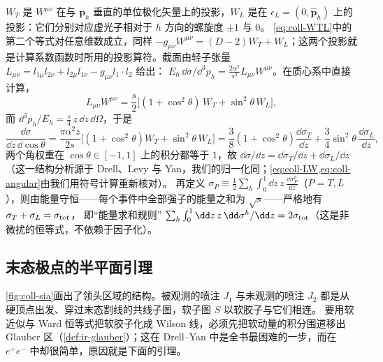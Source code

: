 $W_T$ 是 $W^{\mu\nu}$ 在与 $\bm p_h$ 垂直的单位极化矢量上的投影，$W_L$ 是在 $\epsilon_L=(0,\hat{\bm p}_h)$ 上的投影：它们分别对应虚光子相对于 $h$ 方向的螺旋度 $\pm1$ 与 $0$。
\cref{eq:coll-WTL}中的第二个等式对任意维数成立，同样 $-g_{\mu\nu}W^{\mu\nu}=(D-2)W_T+W_L$；这两个投影就是计算系数函数时所用的投影算符。截面由轻子张量 $L_{\mu\nu}=l_{1\mu}l_{2\nu}+l_{2\mu}l_{1\nu}-g_{\mu\nu}l_1\cdot l_2$ 给出：
$E_h\,\dd\sigma/\dd^3p_h=\frac{2\alpha^2}{s^3}L_{\mu\nu}W^{\mu\nu}$\cite[式~(12.6)]{Collins2011}。在质心系中直接计算，
\begin{equation}\label{eq:coll-LW}
L_{\mu\nu}W^{\mu\nu}=\frac s2\Big[(1+\cos^2\theta)\,W_T+\sin^2\theta\,W_L\Big],
\end{equation}
而 $\dd^3p_h/E_h=\frac s4\,z\,\dd z\,\dd\Omega$，于是
\begin{equation}\label{eq:coll-angular}
\frac{\dd\sigma}{\dd z\,\dd\cos\theta}=\frac{\pi\alpha^2z}{2s}\Big[(1+\cos^2\theta)W_T+\sin^2\theta\,W_L\Big]
=\frac38(1+\cos^2\theta)\frac{\dd\sigma_T}{\dd z}+\frac34\sin^2\theta\,\frac{\dd\sigma_L}{\dd z},
\end{equation}
两个角权重在 $\cos\theta\in[-1,1]$ 上的积分都等于 $1$，故 $\dd\sigma/\dd z=\dd\sigma_T/\dd z+\dd\sigma_L/\dd z$（这一结构分析源于 Drell、Levy 与 Yan，我们的归一化同\cite[第~12.1~节]{Collins2011}；\cref{eq:coll-LW,eq:coll-angular}由我们用符号计算重新核对）。%
再定义 $\sigma_P\equiv\frac12\sum_h\int_0^1\dd z\,z\,\frac{\dd\sigma^h_P}{\dd z}$（$P=T,L$），则由能量守恒——每个事件中全部强子的能量之和为 $\sqrt s$——严格地有 $\sigma_T+\sigma_L=\sigma_{\rm tot}$，
即“能量求和规则” $\sum_h\int_0^1\dd z\,z\,\dd\sigma^h/\dd z=2\sigma_{\rm tot}$（这是非微扰的恒等式，不依赖于因子化）。

\subsection{末态极点的半平面引理}

\cref{fig:coll-sia}画出了领头区域的结构。被观测的喷注 $J_1$ 与未观测的喷注 $J_2$ 都是从硬顶点出发、穿过末态割线的共线子图，软子图 $S$ 以软胶子与它们相连。
要用软近似与 Ward 恒等式把软胶子化成 Wilson 线，必须先把软动量的积分围道移出 Glauber 区（\cref{def:ir-glauber}）；这在 Drell--Yan 中是全书最困难的一步，而在 $e^+e^-$ 中却很简单，原因就是下面的引理。

